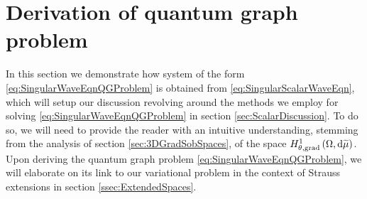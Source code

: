 \section{Derivation of quantum graph problem} \label{sec:ScalarDerivation}
In this section we demonstrate how system of the form \eqref{eq:SingularWaveEqnQGProblem} is obtained from \eqref{eq:SingularScalarWaveEqn}, which will setup our discussion revolving around the methods we employ for solving \eqref{eq:SingularWaveEqnQGProblem} in section \ref{sec:ScalarDiscussion}.
To do so, we will need to provide the reader with an intuitive understanding, stemming from the analysis of section \ref{sec:3DGradSobSpaces}, of the space $H^1_{\theta, \mathrm{grad}}\left( \Omega, \mathrm{d}\widetilde{\mu} \right)$.
Upon deriving the quantum graph problem \eqref{eq:SingularWaveEqnQGProblem}, we will elaborate on its link to our variational problem in the context of Strauss extensions in section \ref{ssec:ExtendedSpaces}.



